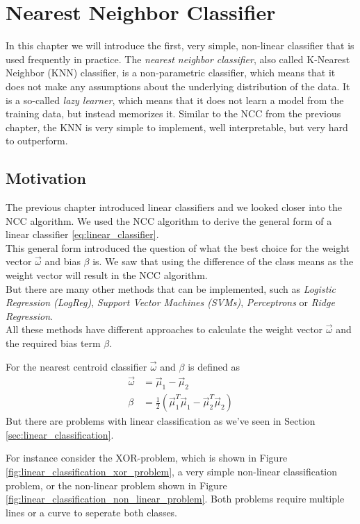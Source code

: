\chapter{Nearest Neighbor Classifier}
\label{ch:knn}
In this chapter we will introduce the first, very simple, non-linear classifier that is used frequently in practice.
The \emph{nearest neighbor classifier}, also called K-Nearest Neighbor (KNN) classifier, is a non-parametric classifier, which means that it does not make any assumptions about the underlying distribution of the data.
It is a so-called \emph{lazy learner}, which means that it does not learn a model from the training data, but instead memorizes it.
Similar to the NCC from the previous chapter, the KNN is very simple to implement, well interpretable, but very hard to outperform.

\section{Motivation}
The previous chapter introduced linear classifiers and we looked closer into the NCC algorithm.
We used the NCC algorithm to derive the general form of a linear classifier \cref{eq:linear_classifier}.\\
This general form introduced the question of what the best choice for the weight vector $\vec{\omega}$ and bias $\beta$ is.
We saw that using the difference of the class means as the weight vector will result in the NCC algorithm.\\
But there are many other methods that can be implemented, such as \textit{Logistic Regression (LogReg)}, \textit{Support Vector Machines (SVMs)}, \textit{Perceptrons} or \textit{Ridge Regression}.\\
All these methods have different approaches to calculate the weight vector $\vec{\omega}$ and the required bias term $\beta$.

For the nearest centroid classifier $\vec{\omega}$ and $\beta$ is defined as
\begin{align*}
  \vec{\omega} &= \vec{\mu}_1 - \vec{\mu}_2\\
  \beta &= \frac{1}{2} \left( \vec{\mu}_1^T \vec{\mu}_1 - \vec{\mu}_2^T \vec{\mu}_2 \right)
\end{align*}
But there are problems with linear classification as we've seen in Section \ref{sec:linear_classification}.

For instance consider the XOR-problem, which is shown in Figure \ref{fig:linear_classification_xor_problem}, a very simple non-linear classification problem, or the non-linear problem shown in Figure \ref{fig:linear_classification_non_linear_problem}.
Both problems require multiple lines or a curve to seperate both classes.

